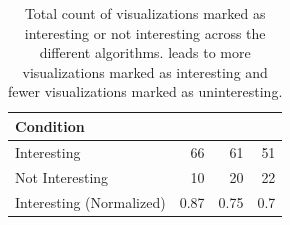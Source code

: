 \begin{table}[ht!]
	\centering
	\begin{tabular}{|l|rrr|}
	\hline
	 \small{Condition}             &   \small{\system} &   \small{\BFS} &   \small{\cluster} \\
	\hline
	 \small{Interesting}            &  \cellcolor{blue!25}       66    & 61    &      51   \\
	 \small{Not Interesting}        &  \cellcolor{blue!25}       10    & 20    &      22   \\
	 \small{Interesting (Normalized)} &   \cellcolor{blue!25}       0.87 &  0.75 &       0.7 \\
	\hline
	\end{tabular}
	\caption{Total count of visualizations marked as interesting or not interesting across the different algorithms. \system leads to more visualizations marked as interesting and fewer visualizations marked as uninteresting.}
	\label{table:interestingScore}
	\vspace{-10pt}
\end{table}

